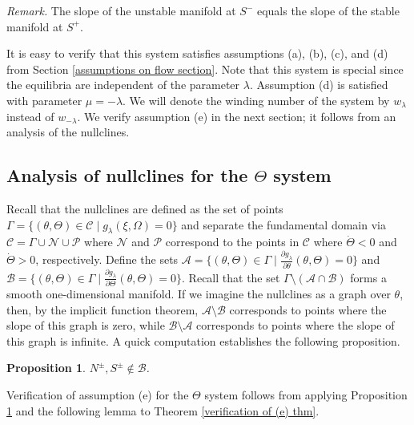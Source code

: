 \documentclass[11 pt]{article}
\newtheorem{prop}[thm]{Proposition}%
\renewcommand\l{\lambda}
\renewcommand\({\left(}
\renewcommand\){\right)}
\newcommand\<{\langle}
\renewcommand\>{\rangle}
\renewcommand\l{\lambda}
\newcommand\8{\infty}
\newcommand{\pd}{\partial}
\newcommand{\mc}{\mathcal}
\begin{document}
\medskip
\medskip

\noindent\emph{Remark.} The slope of the unstable manifold at $S^-$ equals the slope of the stable manifold at $S^+$. 

\medskip
\medskip

It is easy to verify that this system satisfies assumptions (a), (b), (c), and (d) from Section \ref{assumptions on flow section}.  Note that this system is special since the equilibria are independent of the parameter $\l$.  Assumption (d) is satisfied with parameter $\mu = -\lambda$.   We will denote the winding number of the system by $w_\lambda$ instead of $w_{-\lambda}$. We verify assumption (e) in the next section; it follows from an analysis of the nullclines. 

\medskip
\medskip

\subsection{Analysis of nullclines for the $\Theta$ system}

\medskip

 
 Recall that the nullclines are defined as the set of points $\Gamma = \big\{(\theta, \Theta) \in \mc{C} \mid g_\lambda(\xi, \Omega) = 0\big\}$ and separate the fundamental domain via $\mc{C} = \Gamma \cup \mc{N} \cup \mc{P}$ where $\mc{N}$ and $\mc{P}$ correspond to the points in $\mc{C}$ where $\dot{\Theta} < 0$ and $\dot{\Theta} > 0$, respectively. Define the sets $\mc{A} = \big\{(\theta,\Theta) \in \Gamma \mid \frac{\pd g_\lambda}{\pd \theta}(\theta, \Theta) = 0 \big\}$ and $\mc{B} = \big\{(\theta, \Theta) \in \Gamma \mid \frac{\pd g_\lambda}{\pd \Theta}(\theta, \Theta) = 0\big\}$. Recall that the set $\Gamma \setminus (\mc{A} \cap \mc{B})$ forms a smooth one-dimensional manifold.  If we imagine the nullclines as a graph over $\theta$, then, by the implicit function theorem, $\mc{A} \setminus \mc{B}$ corresponds to points where the slope of this graph is zero, while $\mc{B} \setminus \mc{A}$ corresponds to points where the slope of this graph is infinite. A quick computation establishes the following proposition. 

\medskip
\medskip

\begin{prop}\label{equi points for Th prop}
$N^\pm, S^\pm \notin \mc{B}$. 
\end{prop}


\medskip
\medskip

Verification of assumption (e) for the $\Theta$ system follows from applying Proposition \ref{equi points for Th prop} and the following lemma to Theorem \ref{verification of (e) thm}. 
\end{document}
